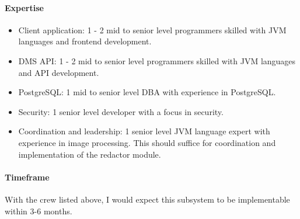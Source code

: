 \paragraph{Expertise}
\begin{itemize}
	\item Client application: 1 - 2 mid to senior level programmers skilled
		with JVM languages and frontend development.
	\item DMS API: 1 - 2 mid to senior level programmers skilled with JVM
		languages and API development.
	\item PostgreSQL: 1 mid to senior level DBA with experience in
		PostgreSQL.
	\item Security: 1 senior level developer with a focus in security.
	\item Coordination and leadership: 1 senior level JVM language expert
		with experience in image processing.  This should suffice for
		coordination and implementation of the redactor module.
\end{itemize}

\paragraph{Timeframe}
With the crew listed above, I would expect this subsystem to be implementable
within 3-6 months.
